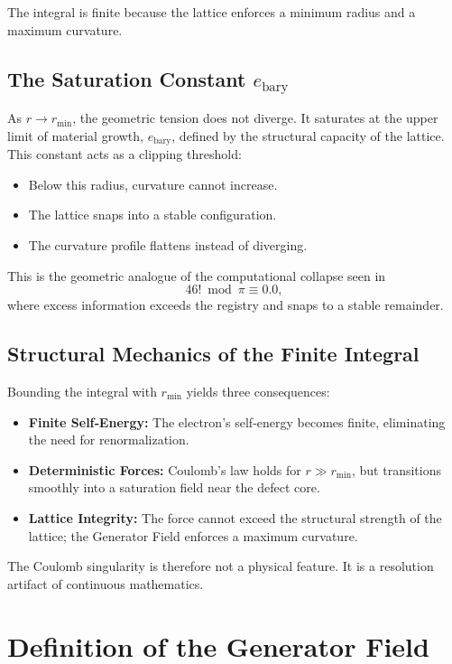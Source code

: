 \documentclass[reprint,amsmath,amssymb,aps,prl,floatfix]{revtex4-2}
\begin{document}
\begin{itemize}
The integral is finite because the lattice enforces a minimum radius and a maximum curvature.

\subsection{The Saturation Constant \(e_{\text{bary}}\)}

As \( r \to r_{\min} \), the geometric tension does not diverge. It saturates at the upper limit of material growth, \( e_{\text{bary}} \), defined by the structural capacity of the lattice. This constant acts as a clipping threshold:
\begin{itemize}
\item Below this radius, curvature cannot increase.  
\item The lattice snaps into a stable configuration.  
\item The curvature profile flattens instead of diverging.
\end{itemize}
\medskip

This is the geometric analogue of the computational collapse seen in  
\[
46! \bmod \pi \equiv 0.0,
\]  
where excess information exceeds the registry and snaps to a stable remainder.
\medskip

\subsection{Structural Mechanics of the Finite Integral}

Bounding the integral with \( r_{\min} \) yields three consequences:
\begin{itemize}
\item \textbf{Finite Self‑Energy:} The electron’s self‑energy becomes finite, eliminating the need for renormalization.  
\item \textbf{Deterministic Forces:} Coulomb’s law holds for \( r \gg r_{\min} \), but transitions smoothly into a saturation field near the defect core.  
\item \textbf{Lattice Integrity:} The force cannot exceed the structural strength of the lattice; the Generator Field enforces a maximum curvature.
\end{itemize}
\medskip

The Coulomb singularity is therefore not a physical feature.  
It is a resolution artifact of continuous mathematics.
\medskip

\section{Definition of the Generator Field}


\end{itemize}
\end{document}
